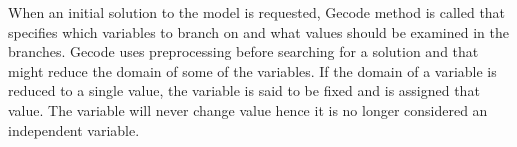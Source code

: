 When an initial solution to the model is requested, Gecode  method is called that specifies which 
variables to branch on and what values should be examined in the branches. Gecode uses preprocessing before searching 
for a solution and that might reduce the domain of some of the variables. If the domain of a variable is reduced to a 
single value, the variable is said to be fixed and is assigned that value. The variable will never change value hence 
it is no longer considered an independent variable.   